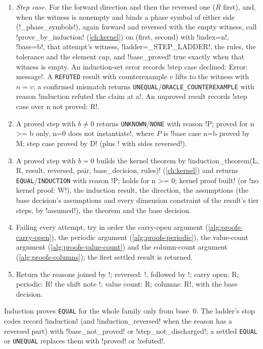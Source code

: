 \begin{algorithm}
\begin{enumerate}
\item \emph{Step case.} For the forward direction and then the reversed one ($R$ first), and, when the witness is nonempty and binds a phase symbol of either side (\py!_phase_symbols!), again forward and reversed with the empty witness, call \py!prove_by_induction! (\cref{ch:kernel}) on (first, second) with \py!index=n!, \py!base=b!, that attempt's witness, \py!ladder=_STEP_LADDER!, the rules, the tolerance and the element cap, and \py!base_proved! true exactly when that witness is empty. An induction-set error records \code!step case declined: Error: message!. A \texttt{REFUTED} result with counterexample $v$ lifts to the witness with $n=v$; a confirmed mismatch returns \texttt{UNEQUAL}/\allowbreak\texttt{ORACLE\_COUNTEREXAMPLE} with reason \code!induction refuted the claim at {a}!. An unproved result records \code!step case over n not proved: R!.
\item A proved step with $b\neq0$ returns \texttt{UNKNOWN}/\allowbreak\texttt{NONE} with reason \code!P; proved for n >= b only, n=0 does not instantiate!, where $P$ is \code!base case n=b proved by M; step case proved by D! (plus \code! with sides reversed!).
\item A proved step with $b=0$ builds the kernel theorem by \py!induction_theorem(L, R, result, reversed, pair, base_decision, rules)! (\cref{ch:kernel}) and returns \texttt{EQUAL}/\allowbreak\texttt{INDUCTION} with reason \code!P; holds for n >= 0; kernel proof built! (or \code!no kernel proof: W!), the induction result, the direction, the assumptions (the base decision's assumptions and every dimension constraint of the result's tier steps, by \py!assumed!), the theorem and the base decision.
\item Failing every attempt, try in order the carry-open argument (\cref{alg:proofs-carry-open}), the periodic argument (\cref{alg:proofs-periodic}), the value-count argument (\cref{alg:proofs-value-count}) and the column-count argument (\cref{alg:proofs-columns}); the first settled result is returned.
\item Return the reasons joined by \code!; reversed: !, followed by \code!; carry open: R; periodic: R! the shift note \code!; value count: R; columns: R!, with the base decision.
\end{enumerate}
\end{algorithm}

Induction proves \texttt{EQUAL} for the whole family only from base~$0$. The ladder's stop codes record \code!induction! (and \code!induction_reversed! when the reason has a reversed part) with \code!base_not_proved! or \code!step_not_discharged!; a settled \texttt{EQUAL} or \texttt{UNEQUAL} replaces them with \code!proved! or \code!refuted!.

